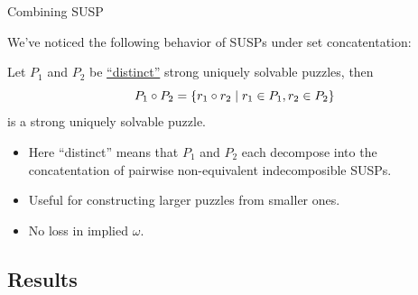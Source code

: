 \documentclass[t,10pt,
mathserif,xcolor=dvipsnames]{beamer}
\begin{document}
\begin{myframe}{Combining SUSP}
   

  We've noticed the following behavior of SUSPs under set concatentation:
  
  \begin{obs}[Experimental]
    Let $P_1$ and $P_2$ be \uline{``distinct''} strong uniquely solvable
    puzzles, then
    $$P_1 \circ P_2 = \{{{r_1 \circ r_2}\;|\;{r_1 \in P_1, r_2 \in
      P_2}}\}$$ is a strong uniquely solvable puzzle.
  \end{obs}

  \begin{itemize}
  \item Here ``distinct'' means that $P_1$ and $P_2$ each decompose
    into the concatentation of pairwise non-equivalent indecomposible
    SUSPs.
  \item Useful for constructing larger puzzles from smaller ones.
  \item No loss in implied $\omega$.
  \end{itemize}


  
\end{myframe}



\subsection{Results}
\end{document}
